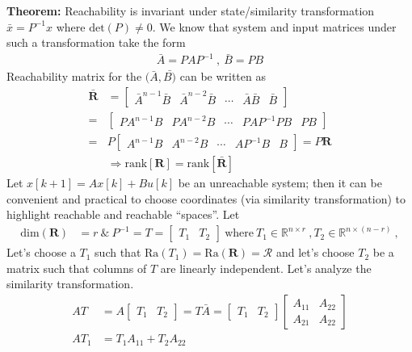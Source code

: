 \documentclass[twoside]{article}
\begin{document}
\textbf{Theorem:} Reachability is invariant under state/similarity transformation $\bar{x} = P^{-1} x$ where $\mathrm{det}(P) \neq 0$. 
We know that system and input matrices under such a transformation take the form
\begin{align*}
    \bar{A} = P A P^{-1} \ , \ \bar{B} = P B
\end{align*}
%
Reachability matrix for the $(\bar{A},\bar{B)}$ can be written as
%
\begin{align*}
   \bar{\mathbf{R}} &= \left[ \begin{array}{c|c|c|c|c} \bar{A}^{n-1} \bar{B} & \bar{A}^{n-2} \bar{B} & \cdots & \bar{A} \bar{B} & \bar{B} \end{array} \right] 
   \\
    =& \left[ \begin{array}{c|c|c|c|c} P A^{n-1} B & P A^{n-2} B & \cdots & P A P^{-1} P B & P B \end{array} \right] 
    \\
    =& P \left[ \begin{array}{c|c|c|c|c} A^{n-1} B & A^{n-2} B & \cdots & A P^{-1} B & B \end{array} \right] = P \mathbf{R}
    \\
    &\Rightarrow \mathrm{rank} [ \mathbf{R} ] = \mathrm{rank} [ \mathbf{\bar{R}} ]
\end{align*}
%
Let $x[k+1] = A x[k] + B u[k]$ be an unreachable system; then it can be convenient and practical to choose coordinates (via similarity transformation)
to highlight reachable and reachable ``spaces''. Let 
%
\begin{align*}
   \mathrm{dim}({\mathbf{R}}) &= r 
   \ \& \
   P^{-1} = T = \left[ \begin{array}{c|c} T_1 & T_2  \end{array} \right] \ \mathrm{where} \ T_1 \in \mathbb{R}^{n \times r} \ , 
   T_2 \in \mathbb{R}^{n \times (n-r)} \ , 
\end{align*}
%
Let's choose a $T_1$ such that $\mathrm{Ra}(T_1) = \mathrm{Ra}(\mathbf{R}) = \mathcal{R}$ and let's choose $T_2$ be a matrix such that 
columns of $T$ are linearly independent. Let's analyze the similarity transformation. 
%
%
\begin{align*}
    A T &=  A \left[ \begin{array}{c|c} T_1 & T_2  \end{array} \right] = T \bar{A} = \left[ \begin{array}{c|c} T_1 & T_2  \end{array} \right]
    \left[ \begin{array}{c|c} A_{11} & A_{22} \\ \hline A_{21} & A_{22}  \end{array} \right]
    \\
    A T_1 &= T_1 A_{11} + T_2 A_{22}
\end{align*}
\end{document}
